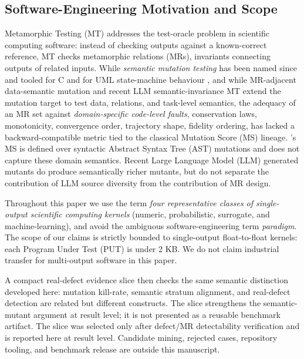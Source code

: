 \documentclass[12pt]{article}
\begin{document}
\subsection{Software-Engineering Motivation and Scope}\label{motivation-and-scope}

Metamorphic Testing (MT) addresses the test-oracle problem in scientific
computing software: instead of checking outputs against a known-correct
reference, MT checks metamorphic relations (MRs), invariants connecting
outputs of related inputs. While \emph{semantic mutation testing} has
been named since \citet{7a6c280d9584691800e71876c716ea229335abeb} and tooled for C \citep{dan2012smtc}
and for UML state-machine behaviour \citep{derezinska2019uml}, and while
MR-adjacent data-semantic mutation \citep{sun2016mumt,sun2024datamutation,zhu2020datamorphic,chan2024metamorphic}
and recent LLM semantic-invariance MT \citep{0fa97cc4e2a0ffb6a777669b1b541c0372fac0d2} extend the mutation target
to test data, relations, and task-level semantics, the adequacy of an MR
set against \emph{domain-specific code-level faults}, conservation laws,
monotonicity, convergence order, trajectory shape, fidelity ordering,
has lacked a backward-compatible metric tied to the classical Mutation
Score (MS) lineage. \citeauthor{d7c38286734419b52de4262c9802ebdfcf4b9447}'s \citeyearpar{d7c38286734419b52de4262c9802ebdfcf4b9447} MS is defined over syntactic
Abstract Syntax Tree (AST) mutations and does not capture these domain
semantics. Recent Large Language Model (LLM) generated mutants \citep{tip2025llmorpheus,humbatova2021deepcrime} do
produce semantically richer mutants, but do not separate the
contribution of LLM source diversity from the contribution of MR design.

Throughout this paper we use the term \emph{four representative classes
of single-output scientific computing kernels} (numeric, probabilistic,
surrogate, and machine-learning), and avoid the ambiguous
software-engineering term \emph{paradigm}. The scope of our claims is
strictly bounded to single-output float-to-float kernels: each
Program Under Test (PUT) is under 2 KB. We do not claim industrial transfer
for multi-output software in this paper.

A compact real-defect evidence slice then checks the same semantic
distinction developed here: mutation kill-rate, semantic stratum
alignment, and real-defect detection are related but different
constructs. The slice strengthens the semantic-mutant argument at result
level; it is not presented as a reusable benchmark artifact. The slice was
selected only after defect/MR detectability verification and is reported
here at result level. Candidate mining, rejected cases, repository
tooling, and benchmark release are outside this manuscript.
\end{document}
